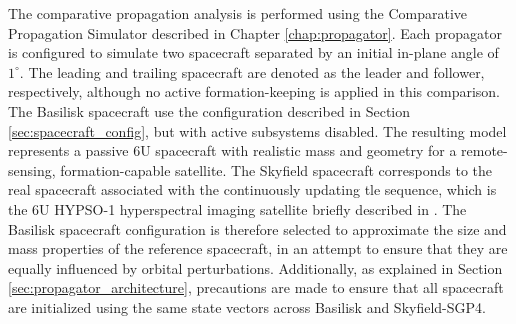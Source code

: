 The comparative propagation analysis is performed using the Comparative Propagation Simulator described in Chapter \ref{chap:propagator}. Each propagator is configured to simulate two spacecraft separated by an initial in-plane angle of $1^\circ$. The leading and trailing spacecraft are denoted as the leader and follower, respectively, although no active formation-keeping is applied in this comparison. The Basilisk spacecraft use the configuration described in Section \ref{sec:spacecraft_config}, but with active subsystems disabled. The resulting model represents a passive 6U spacecraft with realistic mass and geometry for a remote-sensing, formation-capable satellite. The Skyfield spacecraft corresponds to the real spacecraft associated with the continuously updating \gls{tle} sequence, which is the 6U HYPSO-1 hyperspectral imaging satellite briefly described in \cite{hypso_1}. The Basilisk spacecraft configuration is therefore selected to approximate the size and mass properties of the reference spacecraft, in an attempt to ensure that they are equally influenced by orbital perturbations. Additionally, as explained in Section \ref{sec:propagator_architecture}, precautions are made to ensure that all spacecraft are initialized using the same state vectors across Basilisk and Skyfield-SGP4.

